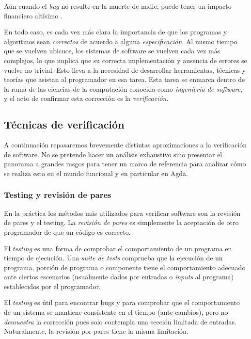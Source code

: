 \documentclass[11pt]{article} %
\begin{document}
Aún cuando el \textit{bug} no resulte en la muerte de nadie, puede tener un impacto financiero altísimo \cite{harrison2003formal}. 

En todo caso, es cada vez más clara la importancia de que los programas y algoritmos sean \textit{correctos} de acuerdo a alguna \textit{especificación}. Al mismo tiempo que se vuelven ubicuos, los sistemas de software se vuelven cada vez más complejos, lo que implica que su correcta implementación y ausencia de errores se vuelve no trivial. Esto lleva a la necesidad de desarrollar herramientas, técnicas y teorías que asistan al programador en esa tarea. Esta tarea se enmarca dentro de la rama de las ciencias de la computación conocida como \textit{ingeniería de software}, y el acto de confirmar esta corrección es la \textit{verificación}. 


\subsection{Técnicas de verificación}
A continuación repasaremos brevemente distintas aproximaciones a la verificación de software. No se pretende hacer un análisis exhaustivo sino presentar el panorama a grandes rasgos para tener un marco de referencia para analizar cómo se realiza esto en el mundo funcional y en particular en Agda. 

\subsubsection{Testing y revisión de pares}
En la práctica los métodos más utilizados para verificar software son la revisión de pares y el testing. La \textit{revisión de pares} es simplemente la aceptación de otro programador de que un código es correcto.

El \textit{testing} es una forma de comprobar el comportamiento de un programa en tiempo de ejecución. Una \textit{suite de tests} comprueba que la ejecución de un programa, porción de programa o componente tiene el comportamiento adecuado ante ciertos escenarios (usualmente dados por entradas o \textit{inputs} al programa) establecidos por el programador. 

El \textit{testing} es útil para encontrar bugs y para comprobar que el comportamiento de un sistema se mantiene consistente en el tiempo (ante cambios), pero no \textit{demuestra} la corrección pues solo contempla una sección limitada de entradas. Naturalmente, la revisión por pares tiene la misma limitación.
\end{document}
